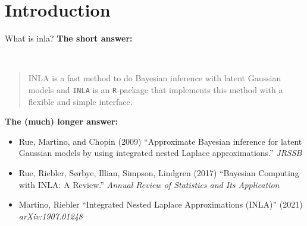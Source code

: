 \documentclass[
  ignorenonframetext,
]{beamer}
\providecommand{\tightlist}{%
  \setlength{\itemsep}{0pt}\setlength{\parskip}{0pt}}
\begin{document}
\begin{frame}
\end{frame}

\hypertarget{introduction}{%
\section{Introduction}\label{introduction}}

\begin{frame}[fragile]{What is inla?}
\protect\hypertarget{what-is-inla}{}
\textbf{The short answer:}\\
\strut \\

\begin{quote}
INLA is a fast method to do Bayesian inference with latent Gaussian
models and \texttt{INLA} is an \texttt{R}-package that implements this
method with a flexible and simple interface.
\end{quote}

\pause

\textbf{The (much) longer answer:}

\begin{itemize}
\tightlist
\item
  Rue, Martino, and Chopin (2009) ``Approximate Bayesian inference for
  latent Gaussian models by using integrated nested Laplace
  approximations.'' \emph{JRSSB}
\item
  Rue, Riebler, Sørbye, Illian, Simpson, Lindgren (2017) ``Bayesian
  Computing with INLA: A Review.'' \emph{Annual Review of Statistics and
  Its Application}
\item
  Martino, Riebler ``Integrated Nested Laplace Approximations (INLA)''
  (2021) \emph{arXiv:1907.01248}
\end{itemize}
\end{frame}

\begin{frame}
\end{frame}

\begin{frame}
\end{frame}
\end{document}
